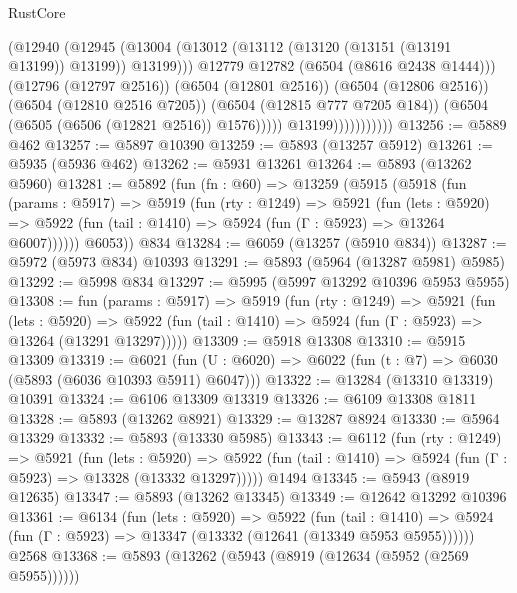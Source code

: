\begin{lexlean}{RustCore}
\begin{coremodule}
                                (@12940
                                  (@12945
                                    (@13004
                                      (@13012
                                        (@13112 (@13120 (@13151 (@13191 @13199)) @13199))
                                        @13199)))
                                  @12779
                                  @12782
                                  (@6504 (@8616 @2438 @1444)))
                                (@12796 (@12797 @2516))
                                (@6504 (@12801 @2516))
                                (@6504 (@12806 @2516))
                                (@6504 (@12810 @2516 @7205))
                                (@6504 (@12815 @777 @7205 @184))
                                (@6504 (@6505 (@6506 (@12821 @2516)) @1576)))))
                          @13199)))))))))))
@13256 := @5889 @462
@13257 := @5897 @10390
@13259 := @5893 (@13257 @5912)
@13261 := @5935 (@5936 @462)
@13262 := @5931 @13261
@13264 := @5893 (@13262 @5960)
@13281 := @5892
    (fun (fn : @60) =>
    @13259
      (@5915
        (@5918
          (fun (params : @5917) =>
          @5919
            (fun (rty : @1249) =>
            @5921
              (fun (lets : @5920) =>
              @5922 (fun (tail : @1410) => @5924 (fun (Γ : @5923) => @13264 @6007))))))
        @6053))
    @834
@13284 := @6059 (@13257 (@5910 @834))
@13287 := @5972 (@5973 @834) @10393
@13291 := @5893 (@5964 (@13287 @5981) @5985)
@13292 := @5998 @834
@13297 := @5995 (@5997 @13292 @10396 @5953 @5955)
@13308 := fun (params : @5917) =>
  @5919
    (fun (rty : @1249) =>
    @5921
      (fun (lets : @5920) =>
      @5922 (fun (tail : @1410) => @5924 (fun (Γ : @5923) => @13264 (@13291 @13297)))))
@13309 := @5918 @13308
@13310 := @5915 @13309
@13319 := @6021
    (fun (U : @6020) => @6022 (fun (t : @7) => @6030 (@5893 (@6036 @10393 @5911) @6047)))
@13322 := @13284 (@13310 @13319) @10391
@13324 := @6106 @13309 @13319
@13326 := @6109 @13308 @1811
@13328 := @5893 (@13262 @8921)
@13329 := @13287 @8924
@13330 := @5964 @13329
@13332 := @5893 (@13330 @5985)
@13343 := @6112
    (fun (rty : @1249) =>
    @5921
      (fun (lets : @5920) =>
      @5922 (fun (tail : @1410) => @5924 (fun (Γ : @5923) => @13328 (@13332 @13297)))))
    @1494
@13345 := @5943 (@8919 @12635)
@13347 := @5893 (@13262 @13345)
@13349 := @12642 @13292 @10396
@13361 := @6134
    (fun (lets : @5920) =>
    @5922
      (fun (tail : @1410) =>
      @5924 (fun (Γ : @5923) => @13347 (@13332 (@12641 (@13349 @5953 @5955))))))
    @2568
@13368 := @5893 (@13262 (@5943 (@8919 (@12634 (@5952 (@2569 @5955))))))

\end{coremodule}
\end{lexlean}
